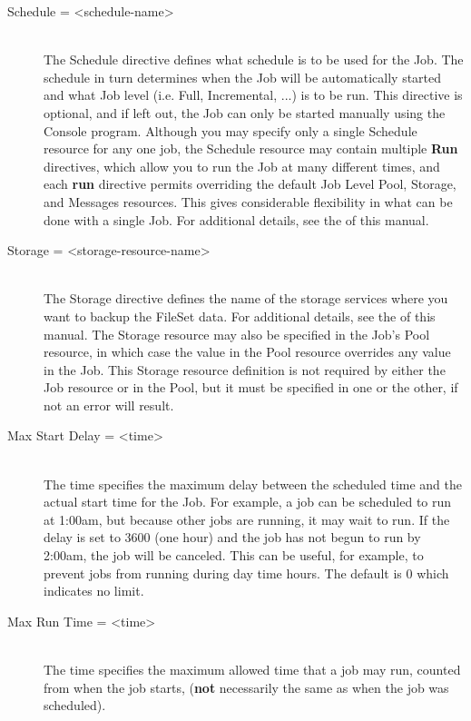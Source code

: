 \begin{description}
\item [Schedule = {\textless}schedule-name{\textgreater}] \hfill \\
The Schedule directive defines what schedule is to be used for the Job.
The schedule in turn determines when the Job will be automatically
started and what Job level (i.e.  Full, Incremental, ...) is to be run.
This directive is optional, and if left out, the Job can only be started
manually using the Console program.  Although you may specify only a
single Schedule resource for any one job, the Schedule resource may
contain multiple {\bf Run} directives, which allow you to run the Job at
many different times, and each {\bf run} directive permits overriding
the default Job Level Pool, Storage, and Messages resources.  This gives
considerable flexibility in what can be done with a single Job.  For
additional details, see the  of this manual.

\item [Storage = {\textless}storage-resource-name{\textgreater}] \hfill \\
The Storage directive defines the name of the storage services where you
want to backup the FileSet data.  For additional details, see the
 of this manual.
The Storage resource may also be specified in the Job's Pool resource,
in which case the value in the Pool resource overrides any value
in the Job. This Storage resource definition is not required by either
the Job resource or in the Pool, but it must be specified in
one or the other, if not an error will result.

\item [Max Start Delay = {\textless}time{\textgreater}] \hfill \\
The time specifies the maximum delay between the scheduled time and the
actual start time for the Job.  For example, a job can be scheduled to
run at 1:00am, but because other jobs are running, it may wait to run.
If the delay is set to 3600 (one hour) and the job has not begun to run
by 2:00am, the job will be canceled.  This can be useful, for example,
to prevent jobs from running during day time hours.  The default is 0
which indicates no limit.

\item [Max Run Time = {\textless}time{\textgreater}] \hfill \\
The time specifies the maximum allowed time that a job may run, counted
from when the job starts, ({\bf not} necessarily the same as when the
job was scheduled).


\end{description}
